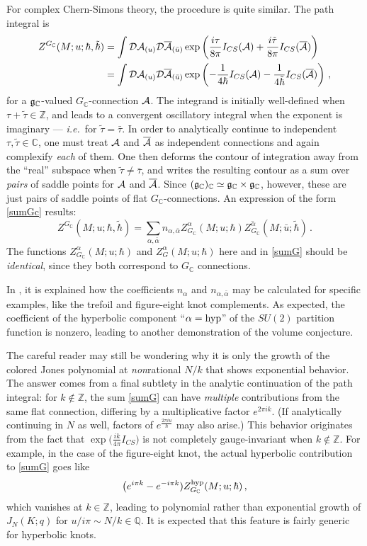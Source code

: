 \documentclass[letterpaper,12pt]{article}
\numberwithin{equation}{section}
\newcommand{\ie}{\emph{i.e.}}
\newcommand{\ol}{\overline}
\newcommand{\be}{\begin{equation}}
\newcommand{\ee}{\end{equation}}
\newcommand{\nno}{\nonumber}
\newcommand{\C}{{\mathbb{C}}}
\newcommand{\Z}{{\mathbb{Z}}}
\newcommand{\Q}{{\mathbb{Q}}}
\newcommand{\fg}{{\frak{g}}}
\newcommand{\CA}{{\cal A}}
\renewcommand{\CD}{{\cal D}}
\renewcommand{\=}{\;=\;}
\begin{document}
For complex Chern-Simons theory, the procedure is quite similar. The path integral is
%
\begin{align} Z^{G_\C}(M;u;\hbar,\tilde{\hbar}) &=
 \int \CD\CA_{(u)}\CD\ol{\CA}_{(\bar{u})}
   \exp\left( \frac{i\tau}{8\pi} I_{CS}(\CA)+ \frac{i\tilde{\tau}}{8\pi} I_{CS}(\ol{\CA}) \right)  \label{Pcx} \\
 &= \int \CD\CA_{(u)}\CD\ol{\CA}_{(\bar{u})}
   \exp\left( -\frac{1}{4\hbar} I_{CS}(\CA)- \frac{1}{4\tilde{\hbar}} I_{CS}(\ol{\CA}) \right)\,, \nno
\end{align}
%
for a $\fg_\C$-valued $G_\C$-connection $\CA$.
The integrand is initially well-defined when $\tau+\tilde{\tau}\in\Z$, and leads to a convergent oscillatory integral when the exponent is imaginary --- \ie\ for $\tilde{\tau}=\bar{\tau}$. In order to analytically continue to independent $\tau,\tilde{\tau}\in\C$, one must treat $\CA$ and $\ol{\CA}$ as independent connections and again complexify \emph{each} of them.  One then deforms the contour of integration away from the ``real'' subspace when $\tilde{\tau}\neq\bar{\tau}$, and writes the resulting contour as a sum over \emph{pairs} of saddle points for $\CA$ and $\ol{\CA}$. Since $(\fg_\C)_\C \simeq \fg_\C\times \fg_\C$, however, these are just pairs of saddle points of flat $G_\C$-connections. An expression of the form \eqref{sumGc} results:
%
\be
\label{sumGG}
Z^{G_\C}(M;u;\hbar,\tilde{\hbar}) = \sum_{\alpha,\bar{\alpha}}n_{\alpha,\bar{\alpha}} Z^{\alpha}_{G_\C}(M;u;\hbar) \ol{Z^{\alpha}_{G_\C}}(M;\bar{u};\tilde{\hbar})\,.
\ee
%
The functions $Z^{\alpha}_{G_\C}(M;u;\hbar)$ and $Z^{\alpha}_{G}(M;u;\hbar)$ here and in \eqref{sumG} should be \emph{identical}, since they both correspond to $G_\C$ connections.



In \cite{Wit-anal}, it is explained how the coefficients $n_\alpha$
and $n_{\alpha,\bar{\alpha}}$ may be calculated for specific examples,
like the trefoil and figure-eight knot complements.
As expected, the coefficient of the hyperbolic component ``$\alpha={\rm hyp}$''
of the $SU(2)$ partition function is nonzero, leading to another demonstration of the volume conjecture.


The careful reader may still be wondering why it is only the growth of the colored Jones polynomial
at \emph{non}rational $N/k$ that shows exponential behavior.
The answer comes from a final subtlety in the analytic continuation
of the path integral: for $k\notin\Z$, the sum \eqref{sumG}
can have \emph{multiple} contributions from the same flat connection,
differing by a multiplicative factor $e^{2\pi i k}$. (If analytically continuing in $N$ as well,
factors of $e^{\frac{2\pi i u}{\hbar}}$ may also arise.)
This behavior originates from the fact that $\exp\big(\frac{ik}{4\pi}I_{CS})$
is not completely gauge-invariant when $k\notin\Z$.
For example, in the case of the figure-eight knot,
the actual hyperbolic contribution to \eqref{sumG} goes like
%
\be \big(e^{i\pi k}-e^{-i\pi k})Z^{\rm hyp}_{G_\C}(M;u;\hbar)\,, \ee
%
which vanishes at $k\in\Z$, leading to polynomial rather than
exponential growth of $J_N(K;q)$ for $u/i\pi \sim N/k\in \Q$.
It is expected that this feature is fairly generic for hyperbolic knots.
\end{document}
